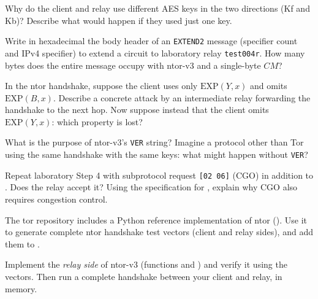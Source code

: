 \begin{esercizio}[1]\label{es:09-direzioni}
Why do the client and relay use different AES keys in the two directions (Kf and Kb)? Describe what would happen if they used just one key.
\end{esercizio}

\begin{esercizio}[2]\label{es:09-extend2}
Write in hexadecimal the body header of an \texttt{EXTEND2} message (specifier count and IPv4 specifier) to extend a circuit to laboratory relay \texttt{test004r}. How many bytes does the entire message occupy with ntor-v3 and a single-byte $CM$?
\end{esercizio}

\begin{esercizio}[2]\label{es:09-ds}
In the ntor handshake, suppose the client uses only $\mathrm{EXP}(Y, x)$ and omits $\mathrm{EXP}(B, x)$. Describe a concrete attack by an intermediate relay forwarding the handshake to the next hop. Now suppose instead that the client omits $\mathrm{EXP}(Y, x)$: which property is lost?
\end{esercizio}

\begin{esercizio}[2]\label{es:09-ver}
What is the purpose of ntor-v3's \texttt{VER} string? Imagine a protocol other than Tor using the same handshake with the same keys: what might happen without \texttt{VER}?
\end{esercizio}

\begin{esercizio}[2]\label{es:09-cc}
Repeat laboratory Step 4 with subprotocol request \texttt{[02 06]} (CGO) in addition to . Does the relay accept it? Using the specification for , explain why CGO also requires congestion control.
\end{esercizio}

\begin{esercizio}[3]\label{es:09-ntor-ref}
The tor repository includes a Python reference implementation of ntor (). Use it to generate complete ntor handshake test vectors (client and relay sides), and add them to .
\end{esercizio}

\begin{esercizio}[3]\label{es:09-relay}
Implement the \emph{relay side} of ntor-v3 (functions  and ) and verify it using the  vectors. Then run a complete handshake between your client and relay, in memory.
\end{esercizio}

